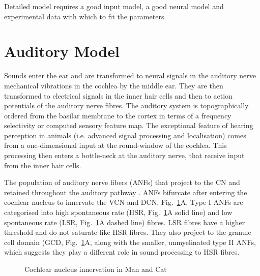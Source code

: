 \medskip{}

Detailed model requires a good input model, a good neural model and
experimental data with which to fit the parameters.  


\section{Auditory Model}

Sounds enter the ear and are transformed to neural signals in the
auditory nerve mechanical vibrations in the cochlea by the middle
ear.   They are then transformed to
electrical signals in the inner hair cells and then to action
potentials of the auditory nerve fibres. The auditory system is
topographically ordered from the basilar membrane to the cortex in
terms of a frequency selectivity or computed sensory feature map.  The
exceptional feature of hearing perception in animals (i.e. advanced
signal processing and localisation) comes from a one-dimensional input
at the round-window of the cochlea. This processing then enters a
bottle-neck at the auditory nerve, that receive input from the inner
hair cells.


The population of auditory nerve fibers (ANFs) that project to the CN
and retained throughout the auditory pathway
\citep{Lorente:1981}. ANFs bifurcate after entering the cochlear
nucleus to innervate the VCN and DCN, Fig.~\ref{fig:CNdiagram}A. Type
I ANFs are categorised into high spontaneous rate (HSR,
Fig.~\ref{fig:CNdiagram}A solid line) and low spontaneous rate (LSR,
Fig.~\ref{fig:CNdiagram}A dashed line) fibres. LSR fibres have a
higher threshold and do not saturate like HSR fibres. They also
project to the granule cell domain (GCD, Fig.~\ref{fig:CNdiagram}A,
\citep{RyugoParks:2003,RyugoHaenggeliEtAl:2003} along with the
smaller, unmyelinated type II ANFs, which suggests they play a
different role in sound processing to HSR fibres.


\begin{figure}[tbh]
  \begin{center}
    \caption{Cochlear nucleus innervation in Man and Cat }
    \label{fig:CNdiagram}
  \end{center}
\end{figure}


